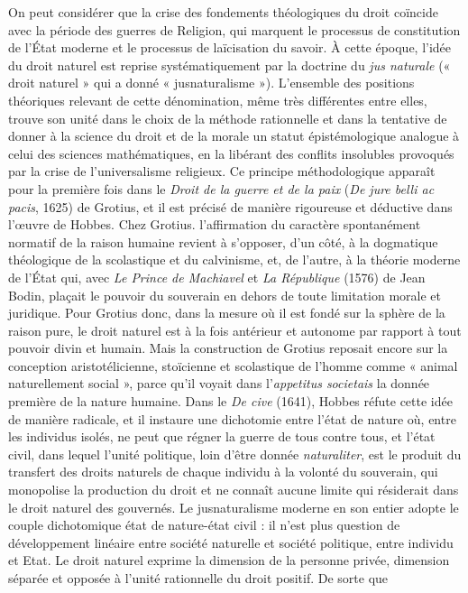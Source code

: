On peut considérer que la crise des fondements théologiques du droit coïncide
avec la période des guerres de Religion,
qui marquent le processus de constitution
de l’État moderne et le processus de laïcisation du savoir. À cette époque, l’idée du
droit naturel est reprise systématiquement par la doctrine du {\it jus naturale}
(« droit naturel » qui a donné « jusnaturalisme »). L'ensemble des positions théoriques relevant de cette dénomination,
même très différentes entre elles, trouve
son unité dans le choix de la méthode
rationnelle et dans la tentative de donner
à la science du droit et de la morale un
statut épistémologique analogue à celui
%
des sciences mathématiques, en la libérant des conflits insolubles provoqués par
la crise de l’universalisme religieux. Ce
principe méthodologique apparaît pour la
première fois dans le {\it Droit de la guerre et de la paix} ({\it De jure belli ac pacis}, 1625)
de Grotius, et il est précisé de manière
rigoureuse et déductive dans l’œuvre de
Hobbes. Chez Grotius. l'affirmation du
caractère spontanément normatif de la
raison humaine revient à s’opposer, d’un
côté, à la dogmatique théologique de la
scolastique et du calvinisme, et, de l’autre,
à la théorie moderne de l’État qui, avec
{\it Le Prince de Machiavel} et {\it La République} (1576) de Jean Bodin, plaçait le pouvoir
du souverain en dehors de toute limitation morale et juridique. Pour Grotius
donc, dans la mesure où il est fondé sur
la sphère de la raison pure, le droit naturel est à la fois antérieur et autonome par
rapport à tout pouvoir divin et humain.
Mais la construction de Grotius reposait
encore sur la conception aristotélicienne,
stoïcienne et scolastique de l’homme
comme « animal naturellement social »,
parce qu'il voyait dans l’{\it appetitus societais} la donnée première de la nature
humaine. Dans le {\it De cive} (1641), Hobbes
réfute cette idée de manière radicale, et
il instaure une dichotomie entre l’état de
nature où, entre les individus isolés, ne
peut que régner la guerre de tous contre
tous, et l’état civil, dans lequel l’unité
politique, loin d’être donnée {\it naturaliter},
est le produit du transfert des droits naturels de chaque individu à la volonté du
souverain, qui monopolise la production
du droit et ne connaît aucune limite qui
résiderait dans le droit naturel des gouvernés. Le jusnaturalisme moderne en son
entier adopte le couple dichotomique état
de nature-état civil : il n’est plus question
de développement linéaire entre société
naturelle et société politique, entre individu et Etat. Le droit naturel exprime la
dimension de la personne privée, dimension séparée et opposée à l’unité rationnelle du droit positif. De sorte que
